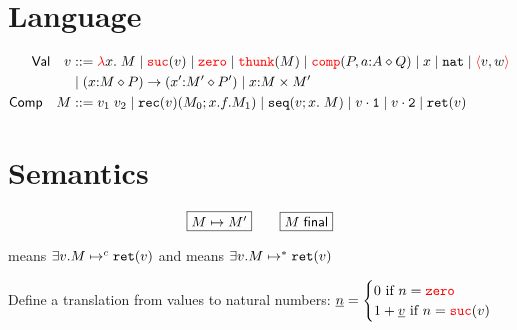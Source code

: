 \section{Language}

\begin{align*}
    \mathsf{Val} \quad v &::= \lam{x}{A}{M} 
    \mid \suc{v}
    \mid \zero 
    \mid \thunk{M}
    \mid \ccomp{P}{\isOf{a}{A}}{Q}
    \mid x
    \mid \nat
    \mid \pair{v}{w}\\
    &\mid \arr{\isOf{x}{M}}{P}{\isOf{x'}{M'}}{P'}
    \mid \dprod{\isOf{x}{M}}{M'}\\
    \mathsf{Comp} \quad M &::= 
     v_1 \; v_2
    \mid \rec{v}{M_0}{x}{f}{M_1}
    \mid \seq{v}{x}{M}
    \mid \fst{v}
    \mid \snd{v}
    \mid \ret{v}\\
\end{align*}

\section{Semantics}
\[
\fbox{$\step{M}{M'}$} \quad\quad \fbox{$\final{M}$}
\]

\begin{mathpar}








\end{mathpar}

 means $\exists v. \stepIn{M}{c}{\ret{v}}$ and  means $\exists v.
\stepIn{M}{*}{\ret{v}}$

Define a translation from values to natural numbers: 
$\toNat{n} = \begin{cases} 0 \text{ if } n = \zero\\
1+\toNat{v} \text{ if } n = \suc{v} \end{cases}$


